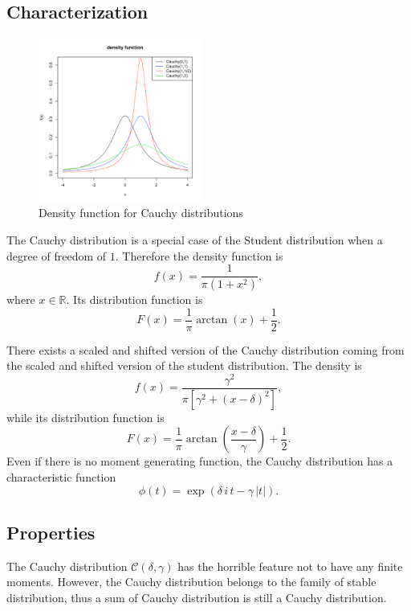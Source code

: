 \subsection{Characterization}
\begin{figure}
  \vspace{-20pt}
  \begin{center}
    \includegraphics[width=0.48\textwidth]{img/cauchyzoom}
  \end{center}
  \vspace{-20pt}  
  \caption{Density function for Cauchy distributions}
\end{figure}
The Cauchy distribution is a special case of the Student distribution when a degree of freedom of $1$. Therefore the density function is
$$
f(x) =\frac{1}{\pi(1+x^2)},
$$
where $x\in \mathbb R$. Its distribution function is 
$$
F(x) = \frac{1}{\pi} \arctan(x)+\frac{1}{2}.
$$

There exists a scaled and shifted version of the Cauchy distribution coming from the scaled and shifted version of the student distribution. The density is
$$
f(x) = \frac{\gamma^2}{\pi \left[\gamma^2 + (x-\delta)^2\right]},
$$
while its distribution function is 
$$
F(x) = \frac{1}{\pi} \arctan\left(\frac{x-\delta}{\gamma}\right)+\frac{1}{2}.
$$
Even if there is no moment generating function, the Cauchy distribution has a characteristic function
$$
\phi(t) = \exp(\delta\,i\,t-\gamma\,|t|).
$$


\subsection{Properties}
The Cauchy distribution $\mathcal C(\delta, \gamma)$ has the horrible feature not to have any finite moments. However, the Cauchy distribution belongs to the family of stable distribution, thus a sum of Cauchy distribution is still a Cauchy distribution.

